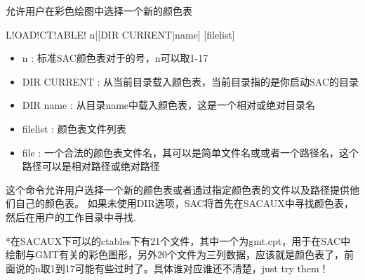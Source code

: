 \label{cmd:loadctable}

允许用户在彩色绘图中选择一个新的颜色表

\begin{SACSTX}
L!OAD!CT!ABLE! n|[DIR CURRENT|name] [filelist]
\end{SACSTX}

\begin{itemize}
\item n : 标准SAC颜色表对于的号，n可以取1-17
\item DIR CURRENT : 从当前目录载入颜色表，当前目录指的是你启动SAC的目录
\item DIR name : 从目录name中载入颜色表，这是一个相对或绝对目录名 
\item filelist : 颜色表文件列表 
\item file : 一个合法的颜色表文件名，其可以是简单文件名或或者一个路径名，这个路径可以是相对路径或绝对路径 
\end{itemize}

这个命令允许用户选择一个新的颜色表或者通过指定颜色表的文件以及路径提供他们自己的颜色表。
如果未使用DIR选项，SAC将首先在SACAUX中寻找颜色表，然后在用户的工作目录中寻找.

*在SACAUX下可以的ctables下有21个文件，其中一个为gmt.cpt，用于在SAC中绘制与GMT有关的彩色图形，另外20个文件为三列数据，应该就是颜色表了，前面说的n取1到17可能有些过时了。具体谁对应谁还不清楚，just try them！
